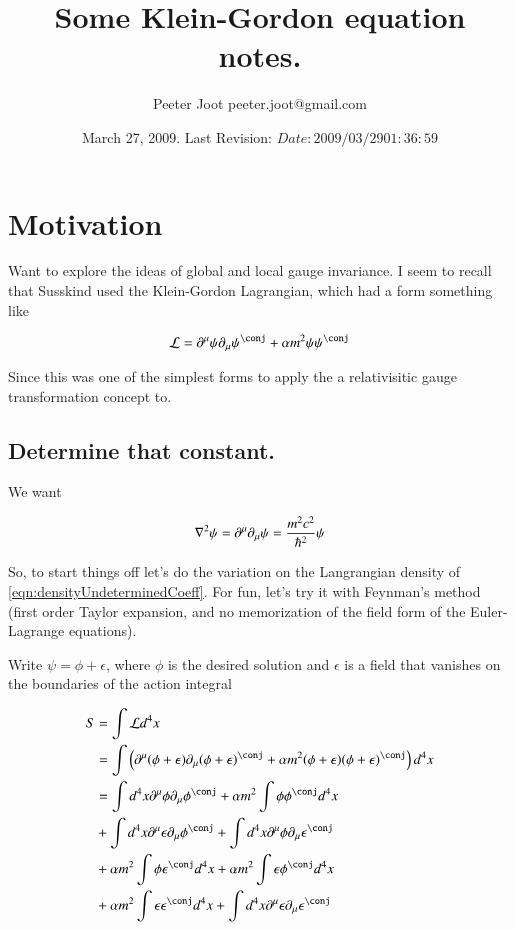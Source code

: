 \documentclass{article}
\title{ Some Klein-Gordon equation notes. }
\author{Peeter Joot \quad peeter.joot@gmail.com }
\date{ March 27, 2009.  Last Revision: $Date: 2009/03/29 01:36:59 $ }
\begin{document}
\maketitle{}
\tableofcontents
\section{ Motivation }

Want to explore the ideas of global and local gauge invariance.  I seem to recall that Susskind
used the Klein-Gordon Lagrangian, which had a form something like

\begin{align}\label{eqn:densityUndeterminedCoeff}
\LL = \partial^\mu \psi \partial_\mu \psi^\conj + \alpha m^2 \psi \psi^\conj
\end{align}

Since this was one of the simplest forms to apply the 
a relativisitic gauge transformation concept to.

\subsection{ Determine that constant. }

We want

\begin{align*}
\nabla^2 \psi = \partial^\mu \partial_\mu \psi = \frac{m^2 c^2}{\hbar^2} \psi
\end{align*}

So, to start things off let's do the variation on the Langrangian density of \ref{eqn:densityUndeterminedCoeff}.  For fun, let's try it with Feynman's method (first order Taylor expansion, and no memorization
of the field form of the Euler-Lagrange equations).

Write $\psi = \phi + \epsilon$, where $\phi$ is the desired solution and $\epsilon$ is a field that
vanishes on the boundaries of the action integral

\begin{align*}
S 
&= \int \LL d^4 x \\
&= 
\int \left( \partial^\mu (\phi + \epsilon) \partial_\mu (\phi + \epsilon)^\conj + \alpha m^2 (\phi + \epsilon) (\phi + \epsilon)^\conj \right) d^4 x \\
&= 
\int d^4 x \partial^\mu \phi \partial_\mu \phi^\conj 
+ \alpha m^2 \int \phi \phi^\conj  d^4 x \\
&+ \int d^4 x \partial^\mu \epsilon \partial_\mu \phi^\conj 
+ \int d^4 x \partial^\mu \phi \partial_\mu \epsilon^\conj  \\
&+ \alpha m^2 \int \phi \epsilon^\conj  d^4 x
+ \alpha m^2 \int \epsilon \phi^\conj  d^4 x \\
&+ \alpha m^2 \int \epsilon \epsilon^\conj  d^4 x
+ \int d^4 x \partial^\mu \epsilon \partial_\mu \epsilon^\conj \\
\end{align*}
\end{document}
